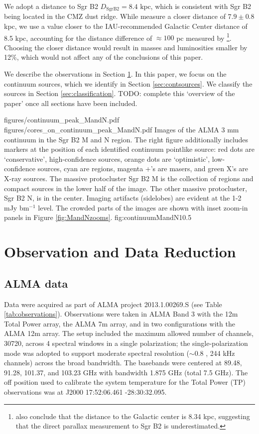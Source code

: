 \documentclass[twocolumn]{aastex61}
\newcommand{\dsgrb}{\ensuremath{8.4\textrm{~kpc}}\xspace}
\begin{document}
We adopt a distance to Sgr B2 $D_{\mathrm{Sgr B2}}=\dsgrb$, which is consistent
with Sgr B2 being located in the CMZ dust ridge.  While \citet{Reid2009a}
measure a closer distance of $7.9\pm0.8$ kpc, we use a value closer to the
IAU-recommended Galactic Center distance of 8.5 kpc, accounting for the
distance difference of $\approx100$ pc measured by
\citet{Reid2009a}\footnote{\citet{Reid2014a} also conclude that the distance to
the Galactic center is 8.34 kpc, suggesting that the direct parallax
measurement to Sgr B2 is underestimated.}.  Choosing the closer distance would
result in masses and luminosities smaller by 12\%, which would not affect any
of the conclusions of this paper.

We describe the observations in Section \ref{sec:observations}. In this paper,
we focus on the continuum sources, which we identify in Section
\ref{sec:contsources}.  We classify the sources in Section
\ref{sec:classification}.  
{\color{red} TODO: complete this `overview of the paper' once all sections have
been included.}

\FigureTwo
{figures/continuum_peak_MandN.pdf}
{figures/cores_on_continuum_peak_MandN.pdf}
{Images of the ALMA 3 mm continuum in the Sgr B2 M and N region.  The right
figure additionally includes markers at the position of each identified
continuum pointlike source: red dots are `conservative', high-confidence
sources, orange dots are `optimistic', low-confidence sources, cyan are \hii
regions, magenta +'s are masers, and green X's are X-ray sources.  The massive
protocluster Sgr B2 M is the collection of \hii regions and compact sources in
the lower half of the image.  The other massive protocluster, Sgr B2 N, is in
the center.  Imaging artifacts (sidelobes) are evident at the 1-2 mJy bm$^{-1}$
level.  The crowded parts of the images are shown with inset zoom-in panels in
Figure \ref{fig:MandNzooms}.
}
{fig:continuumMandN}{1}{0.5\textwidth}

\section{Observation and Data Reduction}
\label{sec:observations}
\subsection{ALMA data}
Data were acquired as part of ALMA project 2013.1.00269.S (see Table
\ref{tab:observations}).  Observations were taken in ALMA Band 3 with the 12m
Total Power array, the ALMA 7m array, and in two
configurations with the ALMA 12m array.  The setup included the maximum allowed
number of channels, 30720, across 4 spectral windows in a single polarization;
the single-polarization mode was adopted to support moderate spectral
resolution ($\sim0.8$ \kms, 244 kHz channels) across the broad bandwidth.  The
basebands were centered at 89.48, 91.28, 101.37, and 103.23 GHz with bandwidth
1.875 GHz (total 7.5 GHz).  The off position used to calibrate the system
temperature for the Total Power (TP) observations was at J2000 17:52:06.461
-28:30:32.095.
\end{document}
